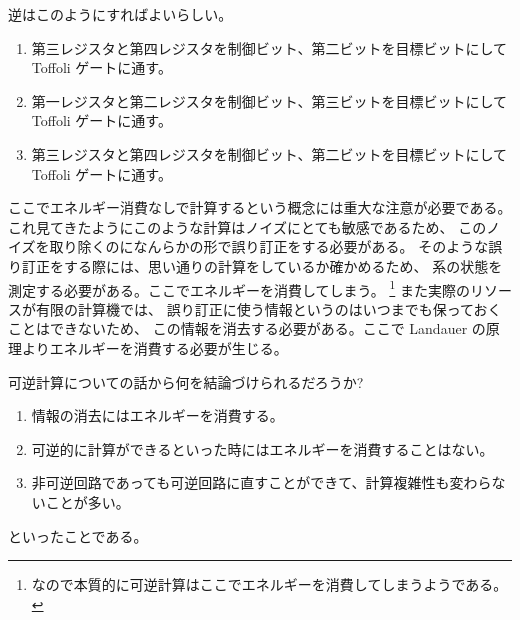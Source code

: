 \documentclass[../../master.tex]{subfiles}
\begin{document}
逆はこのようにすればよいらしい。
\begin{enumerate}
\item 第三レジスタと第四レジスタを制御ビット、第二ビットを目標ビットにして Toffoli ゲートに通す。
\item 第一レジスタと第二レジスタを制御ビット、第三ビットを目標ビットにして Toffoli ゲートに通す。
\item 第三レジスタと第四レジスタを制御ビット、第二ビットを目標ビットにして Toffoli ゲートに通す。
\end{enumerate}

ここでエネルギー消費なしで計算するという概念には重大な注意が必要である。
これ見てきたようにこのような計算はノイズにとても敏感であるため、
このノイズを取り除くのになんらかの形で誤り訂正をする必要がある。
そのような誤り訂正をする際には、思い通りの計算をしているか確かめるため、
系の状態を測定する必要がある。ここでエネルギーを消費してしまう。
\footnote{なので本質的に可逆計算はここでエネルギーを消費してしまうようである。}
また実際のリソースが有限の計算機では、
誤り訂正に使う情報というのはいつまでも保っておくことはできないため、
この情報を消去する必要がある。ここで Landauer の原理よりエネルギーを消費する必要が生じる。

可逆計算についての話から何を結論づけられるだろうか?
\begin{enumerate}
    \item 情報の消去にはエネルギーを消費する。
    \item 可逆的に計算ができるといった時にはエネルギーを消費することはない。
    \item 非可逆回路であっても可逆回路に直すことができて、計算複雑性も変わらないことが多い。
\end{enumerate}
といったことである。
\end{document}
